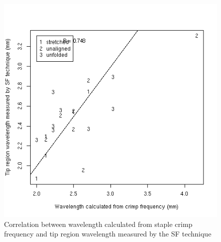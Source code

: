 %

\begin{figure}[!h]
  \centering
  \includegraphics[width=1.0\textwidth]{figcrimpwavlsftip.png}
  \caption{Correlation between wavelength calculated from staple crimp frequency and tip region wavelength measured by the SF technique}
  \label{fig:crimpwavlsftip}
\end{figure}

%

